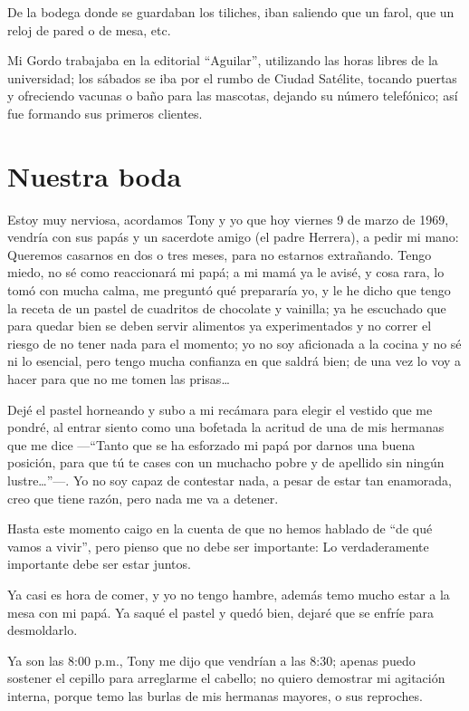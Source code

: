 \documentclass[letterpaper, 12pt]{book}
\begin{document}
De la bodega donde se guardaban los tiliches, iban saliendo que un farol, que un reloj de pared o de mesa, etc.

Mi Gordo trabajaba en la editorial ``Aguilar'', utilizando las horas libres de la universidad; los sábados se iba por el rumbo de Ciudad Satélite, tocando puertas y ofreciendo vacunas o baño para las mascotas, dejando su número telefónico; así fue formando sus primeros clientes.

\chapter{Nuestra boda}
Estoy muy nerviosa, acordamos Tony y yo que hoy viernes 9 de  marzo de 1969, vendría con sus papás y un sacerdote amigo (el padre Herrera), a pedir mi mano: Queremos casarnos en dos o tres meses, para no estarnos extrañando.  Tengo miedo, no sé como reaccionará mi papá; a mi mamá ya le avisé, y cosa rara, lo tomó con mucha calma, me preguntó qué prepararía yo, y le he dicho que tengo la receta de un pastel de cuadritos de chocolate y vainilla; ya he escuchado que para quedar bien se deben servir alimentos ya experimentados y no correr el riesgo de no tener nada para el momento; yo no soy aficionada a la cocina y no sé ni lo esencial, pero tengo mucha confianza en que saldrá bien; de una vez lo voy a hacer para que no me tomen las prisas\ldots

Dejé el pastel horneando y subo a mi recámara para elegir el vestido que me pondré, al entrar siento como una bofetada la acritud de una de mis hermanas que me dice ---``Tanto que se ha esforzado mi papá por darnos una buena posición, para que tú te cases con un muchacho pobre y de apellido sin ningún lustre\ldots''---. Yo no soy capaz de contestar nada, a pesar de estar tan enamorada, creo que tiene razón, pero nada me va a detener. 
 
Hasta este momento caigo en la cuenta de que no hemos hablado de ``de qué vamos a vivir'', pero pienso que no debe ser importante: Lo verdaderamente importante debe ser estar juntos.

Ya casi es hora de comer, y yo no tengo hambre, además temo mucho estar a la mesa con mi papá. Ya saqué el pastel y quedó bien, dejaré que se enfríe para desmoldarlo.

Ya son las 8:00 p.m., Tony me dijo que vendrían a las 8:30; apenas puedo sostener el cepillo para arreglarme el cabello; no quiero demostrar mi agitación interna, porque temo las burlas de mis hermanas mayores, o sus reproches.
\end{document}
